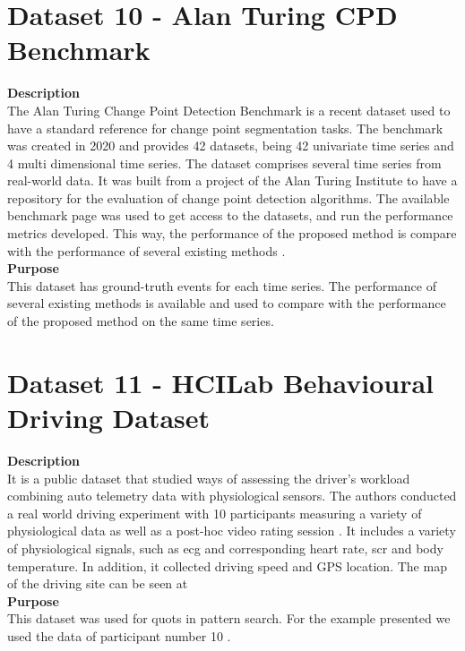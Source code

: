 \section{Dataset 10 - Alan Turing CPD Benchmark}
\label{sec:dataset8}
\textbf{Description}\\
The Alan Turing Change Point Detection Benchmark is a recent dataset used to have a standard reference for change point segmentation tasks. The benchmark was created in 2020 and provides 42 datasets, being 42 univariate time series and 4 multi dimensional time series. The dataset comprises several time series from real-world data. It was built from a project of the Alan Turing Institute to have a repository for the evaluation of change point detection algorithms. The available benchmark page was used to get access to the datasets, and run the performance metrics developed. This way, the performance of the proposed method is compare with the performance of several existing methods \cite{cpd_alan}.\\
\textbf{Purpose}\\
This dataset has ground-truth events for each time series. The performance of several existing methods is available and used to compare with the performance of the proposed method on the same time series.

\section{Dataset 11 - HCILab Behavioural Driving Dataset}
\textbf{Description}\\
It is a public dataset that studied ways of assessing the driver's workload combining auto telemetry data with physiological sensors. The authors conducted a real world driving experiment with 10 participants measuring a variety of physiological data as well as a post-hoc video rating session \cite{hcilab}. It includes a variety of physiological signals, such as \gls{ecg} and corresponding heart rate, \gls{scr} and body temperature. In addition, it collected driving speed and GPS location. The map of the driving site can be seen at \cite{hcilab}\\
\textbf{Purpose}\\
This dataset was used for \gls{quots} in pattern search. For the example presented we used the data of participant number 10 \cite{hcilab}.

